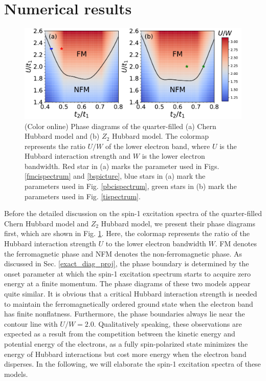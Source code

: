 \documentclass[amsmath,superscriptaddress,showpacs,aps,prb,twocolumn]{revtex4-1}
\begin{document}
\section{Numerical results}\label{nr}
\begin{figure}
\includegraphics[width=\columnwidth]{phase}
\caption{(Color online) Phase diagrams of the quarter-filled (a) Chern Hubbard model and (b) $Z_2$ Hubbard model. The colormap represents the ratio $U/W$ of the lower electron band, where $U$ is the Hubbard interaction strength and $W$ is the lower electron bandwidth. Red star in (a) marks the parameter used in Figs. \ref{fmcispectrum} and \ref{bspicture}, blue stars in (a) mark the parameters used in Fig. \ref{pbcispectrum}, green stars in (b) mark the parameters used in Fig. \ref{tispectrum}.}
\label{phase}
\end{figure}

\par Before the detailed discussion on the spin-1 excitation spectra of the quarter-filled Chern Hubbard model and $Z_2$ Hubbard model, we present their phase diagrams first, which are shown in Fig. \ref{phase}. Here, the colormap represents the ratio of the Hubbard interaction strength $U$ to the lower electron bandwidth $W$. FM denotes the ferromagnetic phase and NFM denotes the non-ferromagnetic phase. As discussed in Sec. \ref{exact_diag_proj}, the phase boundary is determined by the onset parameter at which the spin-1 excitation spectrum starts to acquire zero energy at a finite momentum. The phase diagrams of these two models appear quite similar. It is obvious that a critical Hubbard interaction strength is needed to maintain the ferromagnetically ordered ground state when the electron band has finite nonflatness. Furthermore, the phase boundaries always lie near the contour line with $U/W=2.0$. Qualitatively speaking, these observations are expected as a result from the competition between the kinetic energy and potential energy of the electrons, as a fully spin-polarized state minimizes the energy of Hubbard interactions but cost more energy when the electron band disperses. In the following, we will elaborate the spin-1 excitation spectra of these models.
\end{document}
